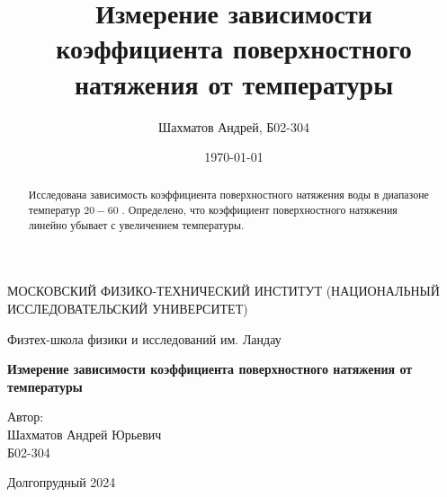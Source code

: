 \documentclass[a4paper,12pt]{report}
\title{Измерение зависимости коэффициента поверхностного натяжения от температуры}
\author{Шахматов Андрей, Б02-304}
\date{\today}
\begin{document}
\begin{titlepage}
    \begin{center}
        {\large МОСКОВСКИЙ ФИЗИКО-ТЕХНИЧЕСКИЙ ИНСТИТУТ (НАЦИОНАЛЬНЫЙ ИССЛЕДОВАТЕЛЬСКИЙ УНИВЕРСИТЕТ)}
    \end{center}
    \begin{center}
        {\large Физтех-школа физики и исследований им. Ландау}
    \end{center}
    
    
    \vspace{3cm}
    {\huge
        \begin{center}
            \textbf{Измерение зависимости коэффициента поверхностного натяжения от температуры}
        \end{center}
    }
    \vspace{2cm}
    \begin{flushright}
        {\LARGE Автор:\\ Шахматов Андрей Юрьевич \\
            \vspace{0.2cm}
            Б02-304}
    \end{flushright}
    \vspace{7 cm}
    \begin{center}
        Долгопрудный 2024
    \end{center}
\end{titlepage}

\pagestyle{fancy}

    \fancyhead{}
    \fancyfoot{}
    \fancyhead[L]{\rightmark}
    \fancyhead[R]{\thepage}


\begin{abstract}
    Исследована зависимость коэффициента поверхностного натяжения воды в диапазоне температур $20 - 60$ \textcelsius. Определено, что 
    коэффициент поверхностного натяжения линейно убывает с увеличением температуры.    
\end{abstract}
\tableofcontents
\end{document}
